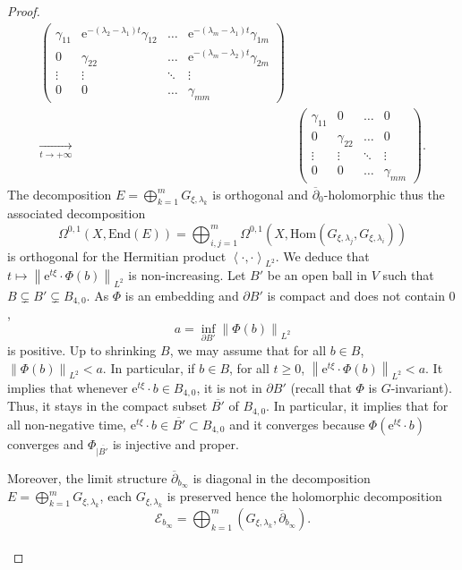 \documentclass[10pt,a4paper]{amsart}
\newcommand{\End}{\mathrm{End}}
\newcommand{\E}{\mathcal{E}}
\newcommand{\Hom}{\mathrm{Hom}}
\newcommand{\dbar}{\overline{\partial}}
\newcommand{\e}{\boldsymbol{\mathrm{e}}}
\newcommand{\norme}[1]{\left\| #1 \right\|}
\newcommand{\scal}[2]{\left< #1,#2 \right>}
\newcommand{\tend}[2]{\underset{#1 \rightarrow #2}{\longrightarrow}}
\renewcommand{\geq}{\geqslant}
\begin{document}
\begin{proof}
\begin{align*}
\begin{pmatrix}
        \gamma_{11} & \e^{-(\lambda_2 - \lambda_1)t}\gamma_{12} & \hdots & \e^{-(\lambda_m - \lambda_1)t}\gamma_{1m}\\
        0 & \gamma_{22} & \hdots & \e^{-(\lambda_m - \lambda_2)t}\gamma_{2m}\\
        \vdots & \vdots & \ddots & \vdots\\
        0 & 0 & \hdots & \gamma_{mm}
    \end{pmatrix}\\
    \tend{t}{+\infty}\ &
    \begin{pmatrix}
        \gamma_{11} & 0 & \hdots & 0\\
        0 & \gamma_{22} & \hdots & 0\\
        \vdots & \vdots & \ddots & \vdots\\
        0 & 0 & \hdots & \gamma_{mm}
    \end{pmatrix}.
\end{align*}
The decomposition $E = \bigoplus_{k = 1}^m G_{\xi,\lambda_k}$ is orthogonal and $\dbar_0$-holomorphic thus the associated decomposition
$$
\Omega^{0,1}(X,\End(E)) = \bigoplus_{i,j = 1}^m \Omega^{0,1}(X,\Hom(G_{\xi,\lambda_j},G_{\xi,\lambda_i}))
$$
is orthogonal for the Hermitian product $\scal{\cdot}{\cdot}_{L^2}$. We deduce that $t \mapsto \norme{\e^{t\xi} \cdot \Phi(b)}_{L^2}$ is non-increasing. Let $B'$ be an open ball in $V$ such that $B \subsetneq B' \subsetneq B_{4,0}$. As $\Phi$ is an embedding and $\partial B'$ is compact and does not contain $0$,
$$
a = \inf_{\partial B'} \norme{\Phi(b)}_{L^2}
$$
is positive. Up to shrinking $B$, we may assume that for all $b \in B$, $\norme{\Phi(b)}_{L^2} < a$. In particular, if $b \in B$, for all $t \geq 0$, $\norme{\e^{t\xi} \cdot \Phi(b)}_{L^2} < a$. It implies that whenever $\e^{t\xi} \cdot b \in B_{4,0}$, it is not in $\partial B'$ (recall that $\Phi$ is $G$-invariant). Thus, it stays in the compact subset $\overline{B'}$ of $B_{4,0}$. In particular, it implies that for all non-negative time, $\e^{t\xi} \cdot b \in \overline{B'} \subset B_{4,0}$ and it converges because $\Phi(\e^{t\xi} \cdot b)$ converges and $\Phi_{|\overline{B'}}$ is injective and proper.

Moreover, the limit structure $\dbar_{b_\infty}$ is diagonal in the decomposition $E = \bigoplus_{k = 1}^m G_{\xi,\lambda_k}$, each $G_{\xi,\lambda_k}$ is preserved hence the holomorphic decomposition
$$
\E_{b_\infty} = \bigoplus_{k = 1}^m (G_{\xi,\lambda_k},\dbar_{b_\infty}).
$$\\


\end{proof}
\end{document}
